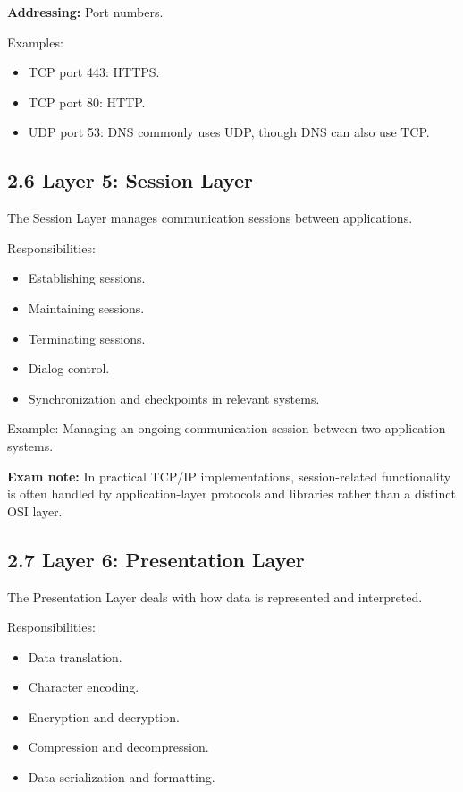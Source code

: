 \textbf{Addressing:} Port numbers.

Examples:

\begin{itemize}
    \item TCP port 443: HTTPS.
    \item TCP port 80: HTTP.
    \item UDP port 53: DNS commonly uses UDP, though DNS can also use TCP.
\end{itemize}

\subsection{2.6 Layer 5: Session Layer}

The Session Layer manages communication sessions between applications.

Responsibilities:

\begin{itemize}
    \item Establishing sessions.
    \item Maintaining sessions.
    \item Terminating sessions.
    \item Dialog control.
    \item Synchronization and checkpoints in relevant systems.
\end{itemize}

Example: Managing an ongoing communication session between two application systems.

\textbf{Exam note:} In practical TCP/IP implementations, session-related functionality is often handled by application-layer protocols and libraries rather than a distinct OSI layer.

\subsection{2.7 Layer 6: Presentation Layer}

The Presentation Layer deals with how data is represented and interpreted.

Responsibilities:

\begin{itemize}
    \item Data translation.
    \item Character encoding.
    \item Encryption and decryption.
    \item Compression and decompression.
    \item Data serialization and formatting.
\end{itemize}

